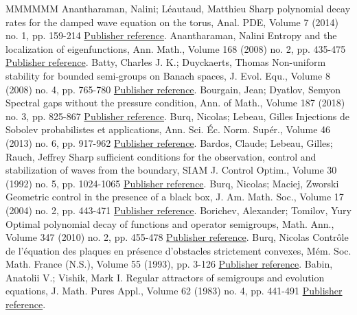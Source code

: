 \begin{thebibliography}{MMMMMM}
 Anantharaman, Nalini; Léautaud, Matthieu Sharp polynomial decay rates for the damped wave equation on the torus, Anal. PDE, Volume 7 (2014) no. 1, pp. 159-214 \href{https://ahl.centre-mersenne.org/item/AHL_2020__3__1241_0/#Ana-Leau}{Publisher reference}.
 Anantharaman, Nalini Entropy and the localization of eigenfunctions, Ann. Math., Volume 168 (2008) no. 2, pp. 435-475 \href{https://ahl.centre-mersenne.org/item/AHL_2020__3__1241_0/#Anant}{Publisher reference}.
 Batty, Charles J. K.; Duyckaerts, Thomas Non-uniform stability for bounded semi-groups on Banach spaces, J. Evol. Equ., Volume 8 (2008) no. 4, pp. 765-780 \href{https://ahl.centre-mersenne.org/item/AHL_2020__3__1241_0/#Batty-Duyckaerts}{Publisher reference}.
 Bourgain, Jean; Dyatlov, Semyon Spectral gaps without the pressure condition, Ann. of Math., Volume 187 (2018) no. 3, pp. 825-867 \href{https://ahl.centre-mersenne.org/item/AHL_2020__3__1241_0/#BourgainDyatlov}{Publisher reference}.
 Burq, Nicolas; Lebeau, Gilles Injections de Sobolev probabilistes et applications, Ann. Sci. Éc. Norm. Supér., Volume 46 (2013) no. 6, pp. 917-962 \href{https://ahl.centre-mersenne.org/item/AHL_2020__3__1241_0/#Burq-Lebeau}{Publisher reference}.
 Bardos, Claude; Lebeau, Gilles; Rauch, Jeffrey Sharp sufficient conditions for the observation, control and stabilization of waves from the boundary, SIAM J. Control Optim., Volume 30 (1992) no. 5, pp. 1024-1065 \href{https://ahl.centre-mersenne.org/item/AHL_2020__3__1241_0/#BLR}{Publisher reference}.
 Burq, Nicolas; Maciej, Zworski Geometric control in the presence of a black box, J. Am. Math. Soc., Volume 17 (2004) no. 2, pp. 443-471 \href{https://ahl.centre-mersenne.org/item/AHL_2020__3__1241_0/#Burq-Zworski}{Publisher reference}.
 Borichev, Alexander; Tomilov, Yury Optimal polynomial decay of functions and operator semigroups, Math. Ann., Volume 347 (2010) no. 2, pp. 455-478 \href{https://ahl.centre-mersenne.org/item/AHL_2020__3__1241_0/#Bor-Tom}{Publisher reference}.
 Burq, Nicolas Contrôle de l’équation des plaques en présence d’obstacles strictement convexes, Mém. Soc. Math. France (N.S.), Volume 55 (1993), pp. 3-126 \href{https://ahl.centre-mersenne.org/item/AHL_2020__3__1241_0/#Burq-memoire}{Publisher reference}.
 Babin, Anatolii V.; Vishik, Mark I. Regular attractors of semigroups and evolution equations, J. Math. Pures Appl., Volume 62 (1983) no. 4, pp. 441-491 \href{https://ahl.centre-mersenne.org/item/AHL_2020__3__1241_0/#Babin-Vishik}{Publisher reference}.

\end{thebibliography}
